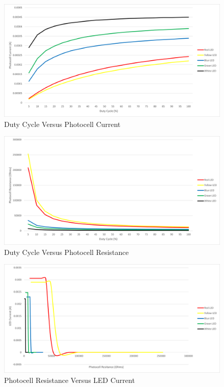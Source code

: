 \documentclass[12pt,titlepage]{article}
\begin{document}
\begin{figure}[!htb]
    \centering
    \includegraphics[width=5in]{lab_3/duty_cycle_photo_curr.png}
    \caption{Duty Cycle Versus Photocell Current}\label{fig:duty_cycle_photo_curr}
\end{figure}
\begin{figure}[!htb]
  \centering
  \includegraphics[width=5in]{lab_3/duty_cycle_photo_res.png}
  \caption{Duty Cycle Versus Photocell Resistance}\label{fig:duty_cycle_photo_res}
\end{figure}
\begin{figure}[!htb]
    \centering
    \includegraphics[width=5in]{lab_3/photo_res_led_curr.png}
    \caption{Photocell Resistance Versus LED Current}\label{fig:photo_res_led_curr}
\end{figure}
\end{document}
